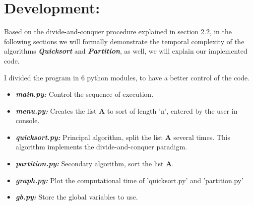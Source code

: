 \section{Development:}

Based on the divide-and-conquer procedure explained in section 2.2, in the following sections we will formally demonstrate the temporal complexity of the algorithms {\bfseries\itshape Quicksort} and {\bfseries\itshape Partition}, as well, we will explain our implemented code. \hfill \break

I divided the program in 6 python modules, to have a better control of the code.

\begin{itemize}
\item {\bfseries\itshape main.py:} Control the sequence of execution.
\item {\bfseries\itshape menu.py:} Creates the list {\bfseries A} to sort of length 'n', entered by the user in console.
\item {\bfseries\itshape quicksort.py:} Principal algorithm, split the list {\bfseries A} several times. This algorithm implements the divide-and-conquer paradigm.
\item {\bfseries\itshape partition.py:} Secondary algorithm, sort the list {\bfseries A}.
\item {\bfseries\itshape graph.py:} Plot the computational time of 'quicksort.py' and 'partition.py'
\item {\bfseries\itshape gb.py:} Store the global variables to use.
\end{itemize}
